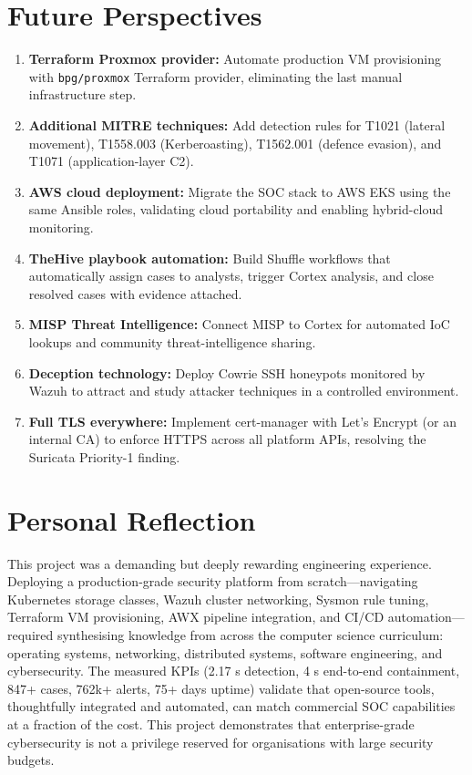 \documentclass[12pt,a4paper]{report}
\begin{document}
\section*{Future Perspectives}

\begin{enumerate}
  \item \textbf{Terraform Proxmox provider:} Automate production VM provisioning with \texttt{bpg/proxmox} Terraform provider, eliminating the last manual infrastructure step.
  \item \textbf{Additional MITRE techniques:} Add detection rules for T1021 (lateral movement), T1558.003 (Kerberoasting), T1562.001 (defence evasion), and T1071 (application-layer C2).
  \item \textbf{AWS cloud deployment:} Migrate the SOC stack to AWS EKS using the same Ansible roles, validating cloud portability and enabling hybrid-cloud monitoring.
  \item \textbf{TheHive playbook automation:} Build Shuffle workflows that automatically assign cases to analysts, trigger Cortex analysis, and close resolved cases with evidence attached.
  \item \textbf{MISP Threat Intelligence:} Connect MISP to Cortex for automated IoC lookups and community threat-intelligence sharing.
  \item \textbf{Deception technology:} Deploy Cowrie SSH honeypots monitored by Wazuh to attract and study attacker techniques in a controlled environment.
  \item \textbf{Full TLS everywhere:} Implement cert-manager with Let's Encrypt (or an internal CA) to enforce HTTPS across all platform APIs, resolving the Suricata Priority-1 finding.
\end{enumerate}

\section*{Personal Reflection}

This project was a demanding but deeply rewarding engineering experience. Deploying a production-grade security platform from scratch---navigating Kubernetes storage classes, Wazuh cluster networking, Sysmon rule tuning, Terraform VM provisioning, AWX pipeline integration, and CI/CD automation---required synthesising knowledge from across the computer science curriculum: operating systems, networking, distributed systems, software engineering, and cybersecurity. The measured KPIs (2.17 s detection, 4 s end-to-end containment, 847+ cases, 762k+ alerts, 75+ days uptime) validate that open-source tools, thoughtfully integrated and automated, can match commercial SOC capabilities at a fraction of the cost. This project demonstrates that enterprise-grade cybersecurity is not a privilege reserved for organisations with large security budgets.
\end{document}
